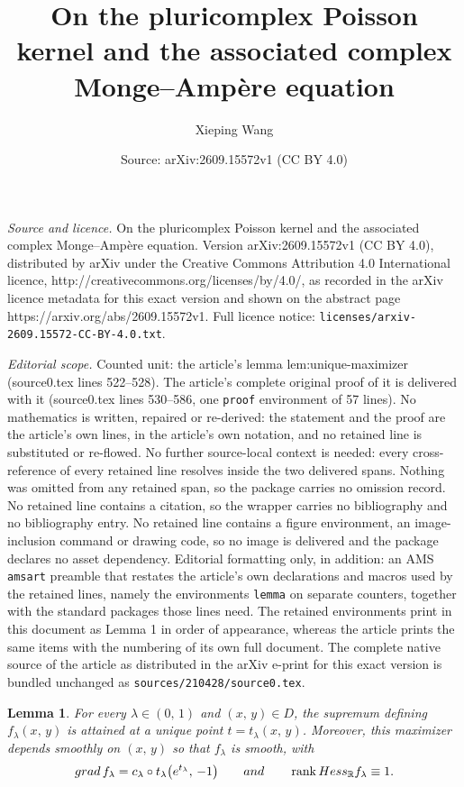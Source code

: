 \documentclass[10pt,a4paper]{amsart}
\title{On the pluricomplex Poisson kernel and the associated complex Monge--Amp\`{e}re equation}
\author{Xieping Wang}
\date{Source: arXiv:2609.15572v1 (CC BY 4.0)}
\newtheorem{lemma}{Lemma}
\DeclareMathOperator{\rank}{rank}
\begin{document}
\maketitle

\noindent\emph{Source and licence.} On the pluricomplex Poisson kernel and the associated complex Monge--Amp\`{e}re equation. Version arXiv:2609.15572v1 (CC BY 4.0), distributed by arXiv under the Creative Commons Attribution 4.0 International licence, http://creativecommons.org/licenses/by/4.0/, as recorded in the arXiv licence metadata for this exact version and shown on the abstract page https://arxiv.org/abs/2609.15572v1. Full licence notice: \texttt{licenses/arxiv-2609.15572-CC-BY-4.0.txt}.\par\smallskip

\noindent\textit{Editorial scope.} Counted unit: the article's lemma lem:unique-maximizer (source0.tex lines 522--528). The article's complete original proof of it is delivered with it (source0.tex lines 530--586, one \texttt{proof} environment of 57 lines). No mathematics is written, repaired or re-derived: the statement and the proof are the article's own lines, in the article's own notation, and no retained line is substituted or re-flowed.  No further source-local context is needed: every cross-reference of every retained line resolves inside the two delivered spans.  Nothing was omitted from any retained span, so the package carries no omission record.  No retained line contains a citation, so the wrapper carries no bibliography and no bibliography entry.  No retained line contains a figure environment, an image-inclusion command or drawing code, so no image is delivered and the package declares no asset dependency.  Editorial formatting only, in addition: an AMS \texttt{amsart} preamble that restates the article's own declarations and macros used by the retained lines, namely the environments \texttt{lemma} on separate counters, together with the standard packages those lines need.  The retained environments print in this document as Lemma 1 in order of appearance, whereas the article prints the same items with the numbering of its own full document.  The complete native source of the article as distributed in the arXiv e-print for this exact version is bundled unchanged as \texttt{sources/210428/source0.tex}.
\begin{lemma}\label{lem:unique-maximizer} For every $\lambda\in(0,\, 1)$ and $(x,\, y)\in D$, the supremum defining $f_{\lambda}(x,\,y)$ is attained at a unique point $t=t_{\lambda}(x,\,y)$. Moreover, this maximizer depends smoothly on $(x,\, y)$  so that $f_{\lambda}$ is
smooth, with
   $$
   {\rm grad}\, f_{\lambda}=c_{\lambda}\circ t_{\lambda} \bigl(e^{t_{\lambda}},\, -1\bigr)
   \qquad {\rm and } \qquad  \rank {\rm Hess}_{\mathbb R}f_{\lambda}\equiv 1.
   $$
\end{lemma}
\end{document}
